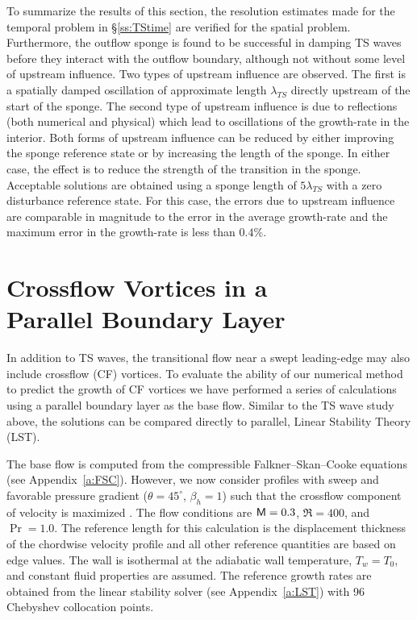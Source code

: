To summarize the results of this section, the resolution estimates made for
the temporal problem in \S\ref{ss:TStime} are verified for the spatial
problem.  Furthermore, the outflow sponge is found to be successful in damping
TS waves before they interact with the outflow boundary, although not without
some level of upstream influence.  Two types of upstream influence are
observed.  The first is a spatially damped oscillation of approximate length
$\lambda_{TS}$ directly upstream of the start of the sponge.  The second type
of upstream influence is due to reflections (both numerical and physical)
which lead to oscillations of the growth-rate in the interior.  Both forms of
upstream influence can be reduced by either improving the sponge reference
state or by increasing the length of the sponge.  In either case, the effect
is to reduce the strength of the transition in the sponge.  Acceptable
solutions are obtained using a sponge length of $5\lambda_{TS}$ with a zero
disturbance reference state.  For this case, the errors due to upstream
influence are comparable in magnitude to the error in the average growth-rate
and the maximum error in the growth-rate is less than $0.4\%$.
%
%

\section[Crossflow Vortices in a Parallel Boundary Layer.]{Crossflow 
Vortices in a \protect \\ Parallel Boundary Layer \label{s:CFtest}}

In addition to TS waves, the transitional flow near a swept leading-edge may
also include crossflow (CF) vortices.  To evaluate the ability of our
numerical method to predict the growth of CF vortices we have performed a
series of calculations using a parallel boundary layer as the base flow.
Similar to the TS wave study above, the solutions can be compared directly to
parallel, Linear Stability Theory (LST).

The base flow is computed from the compressible Falkner--Skan--Cooke equations
(see Appendix~\ref{a:FSC}).  However, we now consider profiles with sweep and
favorable pressure gradient ($\theta=45^\circ$, $\beta_h=1$) such that the
crossflow component of velocity is maximized \cite{Mack:84a}.  The flow
conditions are ${\sf M}=0.3$, $\Re=400$, and $\Pr=1.0$.  The reference length for
this calculation is the displacement thickness of the chordwise velocity
profile and all other reference quantities are based on edge values.  The wall
is isothermal at the adiabatic wall temperature, $T_w = T_0$, and constant
fluid properties are assumed.  The reference growth rates are obtained from
the linear stability solver (see Appendix~\ref{a:LST}) with 96 Chebyshev
collocation points.


